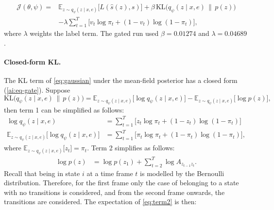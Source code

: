 \begin{equation}
  \begin{aligned}
  \mathcal{J}(\theta, \psi) = {}& \mathbb{E}_{z \sim q_\psi(z \mid x, e)}\big[L(\hat s(z), s)\big] + \beta\,\mathrm{KL}\big(q_\psi(z \mid x, e)\,\|\,p(z)\big) \\
  & - \lambda\sum_{t=1}^{T}\big[v_t\log\pi_t + (1-v_t)\log(1-\pi_t)\big],
  \end{aligned}
  \label{eq:obj}
\end{equation}
where $\lambda$ weights the label term. The gated run used $\beta = 0.01274$ and $\lambda = 0.04689$.

\paragraph{Closed-form KL.} The KL term of \eqref{eq:gaussian} under the mean-field posterior has a closed form (\ref{ai:eq-gate}). Suppose 
\begin{equation}
  \mathrm{KL}\big(q_\psi(z \mid x, e)\,\|\,p(z)\big) = \mathbb{E}_{z \sim q_\psi(z \mid x,e)}\big[\log q_\psi(z \mid x, e)\big] - \mathbb{E}_{z \sim q_\psi(z \mid x,e)}\big[\log p(z)\big],
\end{equation}
then term 1 can be simplified as follows:
\begin{equation}
  \begin{aligned}
      \log q_\psi(z \mid x, e) &= \sum_{t=1}^{T}\big[z_t\log\pi_t + (1-z_t)\log(1-\pi_t)\big] \\
     \mathbb{E}_{z \sim q_\psi(z \mid x,e)}\big[\log q_\psi(z \mid x, e)\big] &= \sum_{t=1}^{T}\big[\pi_t\log\pi_t + (1-\pi_t)\log(1-\pi_t)\big],
      \label{eq:term1}
    \end{aligned}
\end{equation}
where $\mathbb{E}_{z \sim q_\psi(z \mid x,e)}\big[z_t\big] = \pi_t$. Term 2 simplifies as follows:
\begin{equation}
  \begin{aligned}
    \log p(z) &= \log p(z_1) + \sum_{t=2}^{T}\log A_{z_{t-1} z_t}.
  \end{aligned}
  \label{eq:term2}
\end{equation}
Recall that being in state $i$ at a time frame $t$ is modelled by the Bernoulli distribution. Therefore, for the first frame only the case of belonging to a state with no transitions is considered, and from the second frame onwards, the transitions are considered. The expectation of \eqref{eq:term2} is then:
